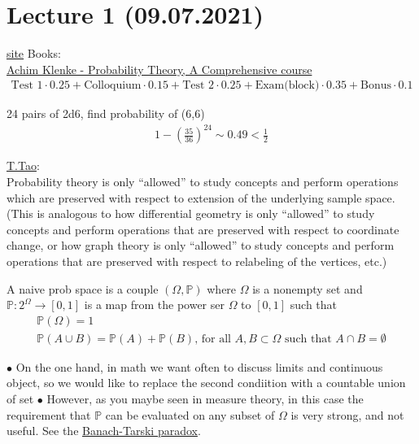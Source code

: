 \section{Lecture 1 (09.07.2021)}
\vskip 0.1in
\href{https://sites.google.com/view/terver2122}{site}
\vskip 0.1in
Books:\\
\href{https://www.springer.com/gp/book/9781447153610}{Achim Klenke - Probability Theory, A Comprehensive course}
\begin{gather*}
	\text{Test 1} \cdot 0.25 + \text{Colloquium} \cdot 0.15 + \text{Test 2} \cdot 0.25 + \text{Exam(block)} \cdot 0.35 + \text{Bonus} \cdot 0.1
\end{gather*}
\vskip 0.2in
\begin{exmp}
	24 pairs of 2d6, find probability of (6,6)\\
	\begin{gather*}
		1 - \left(\frac{35}{36}\right)^{24} \sim 0.49 < \frac{1}{2}
	\end{gather*}
\end{exmp}

\href{https://terrytao.wordpress.com/2010/01/01/254a-notes-0-a-review-of-probability-theory/}{T.Tao}:\\
Probability theory is only “allowed” to study concepts and perform operations which are preserved with respect to extension of the underlying sample space. (This is analogous to how differential geometry is only “allowed” to study concepts and perform operations that are preserved with respect to coordinate change, or how graph theory is only “allowed” to study concepts and perform operations that are preserved with respect to relabeling of the vertices, etc.)
\vskip 0.2in

\begin{defn}
	A naive prob space is a couple $(\Omega, \mathbb{P})$ where $\Omega$ is a nonempty set and $\mathbb{P}: 2^{\Omega}\to [0,1]$ is a map from the power ser $\Omega$ to $[0,1]$ such that
	\begin{gather*}
		\mathbb{P}(\Omega) = 1\\
		\mathbb{P}(A \cup B) = \mathbb{P}(A) + \mathbb{P}(B) \text{, for all } A,B \subset \Omega \text{ such that } A \cap B = \emptyset
	\end{gather*}
\end{defn}

$\bullet$ On the one hand, in math we want often to discuss limits and continuous object, so we would like to replace the second condiition with a countable union of set
\vskip 0.1in
$\bullet$ However, as you maybe seen in measure theory, in this case the requirement that $\mathbb{P}$ can be evaluated on any subset of $\Omega$ is very strong, and not useful. See the \href{https://bit.ly/2Z3L8px}{Banach-Tarski paradox}.

